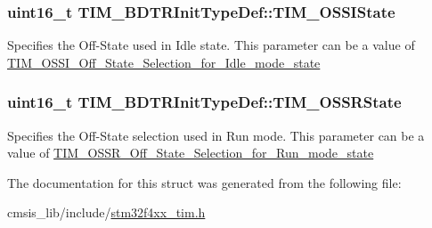 \subsubsection[{\texorpdfstring{T\+I\+M\+\_\+\+O\+S\+S\+I\+State}{TIM_OSSIState}}]{\setlength{\rightskip}{0pt plus 5cm}uint16\+\_\+t T\+I\+M\+\_\+\+B\+D\+T\+R\+Init\+Type\+Def\+::\+T\+I\+M\+\_\+\+O\+S\+S\+I\+State}\hypertarget{struct_t_i_m___b_d_t_r_init_type_def_ad8891e3739a7db8a45343d4e2f9d2824}{}\label{struct_t_i_m___b_d_t_r_init_type_def_ad8891e3739a7db8a45343d4e2f9d2824}
Specifies the Off-\/\+State used in Idle state. This parameter can be a value of \hyperlink{group___t_i_m___o_s_s_i___off___state___selection__for___idle__mode__state}{T\+I\+M\+\_\+\+O\+S\+S\+I\+\_\+\+Off\+\_\+\+State\+\_\+\+Selection\+\_\+for\+\_\+\+Idle\+\_\+mode\+\_\+state} 
\subsubsection[{\texorpdfstring{T\+I\+M\+\_\+\+O\+S\+S\+R\+State}{TIM_OSSRState}}]{\setlength{\rightskip}{0pt plus 5cm}uint16\+\_\+t T\+I\+M\+\_\+\+B\+D\+T\+R\+Init\+Type\+Def\+::\+T\+I\+M\+\_\+\+O\+S\+S\+R\+State}\hypertarget{struct_t_i_m___b_d_t_r_init_type_def_a8f34ad7bc4764bd3ff372cadde468072}{}\label{struct_t_i_m___b_d_t_r_init_type_def_a8f34ad7bc4764bd3ff372cadde468072}
Specifies the Off-\/\+State selection used in Run mode. This parameter can be a value of \hyperlink{group___t_i_m___o_s_s_r___off___state___selection__for___run__mode__state}{T\+I\+M\+\_\+\+O\+S\+S\+R\+\_\+\+Off\+\_\+\+State\+\_\+\+Selection\+\_\+for\+\_\+\+Run\+\_\+mode\+\_\+state} 

The documentation for this struct was generated from the following file\+:\begin{DoxyCompactItemize}
\item 
cmsis\+\_\+lib/include/\hyperlink{stm32f4xx__tim_8h}{stm32f4xx\+\_\+tim.\+h}\end{DoxyCompactItemize}
